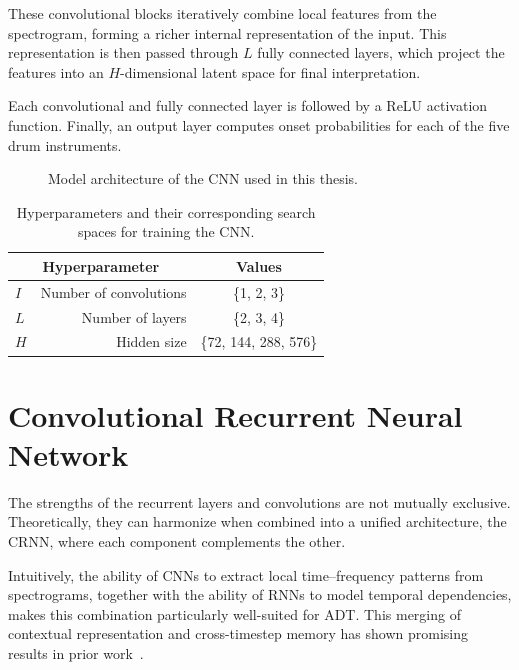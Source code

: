 These convolutional blocks iteratively combine local features from the spectrogram, forming a richer internal representation of the input. This representation is then passed through $L$ fully connected layers, which project the features into an $H$-dimensional latent space for final interpretation. 

Each convolutional and fully connected layer is followed by a \gls{ReLU} activation function. Finally, an output layer computes onset probabilities for each of the five drum instruments.

\begin{figure}[H]
    \centering
    
    \caption{Model architecture of the \acrlong{CNN} used in this thesis.}
    \label{CNNFigure}
\end{figure}

\begin{table}[H]
    \centering
    \begin{tabular}{lr|c}
        \multicolumn{2}{c|}{Hyperparameter} & Values       \\
        \hline
        $I$ & Number of convolutions & \{1, 2, 3\}\\
        $L$ & Number of layers      & \{2, 3, 4\} \\
        $H$ & Hidden size      & \{72, 144, 288, 576\} \\
    \end{tabular}
    \caption{Hyperparameters and their corresponding search spaces for training the \acrlong{CNN}.}
    \label{CNNHyperparams}
\end{table}

\section[Convolutional RNN]{Convolutional Recurrent Neural Network}

The strengths of the recurrent layers and convolutions are not mutually exclusive. Theoretically, they can harmonize when combined into a unified architecture, the \gls{CRNN}, where each component complements the other.

Intuitively, the ability of \glspl{CNN} to extract local time–frequency patterns from spectrograms, together with the ability of \glspl{RNN} to model temporal dependencies, makes this combination particularly well-suited for \gls{ADT}. This merging of contextual representation and cross-timestep memory has shown promising results in prior work~\cite{Vogl2017DrumTV, vogl2018multiinstrumentdrumtranscription, signals4040042}.

